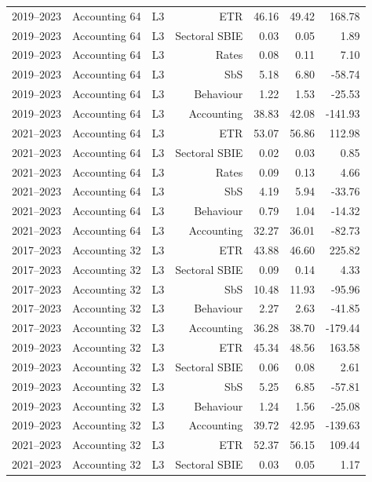 {\begin{longtable}{@{}lrrrrrr@{}}
2019–2023 & Accounting 64 & L3 & ETR & 46.16 & 49.42 &  168.78 \\
2019–2023 & Accounting 64 & L3 & Sectoral SBIE &  0.03 &  0.05 &    1.89 \\
2019–2023 & Accounting 64 & L3 & Rates &  0.08 &  0.11 &    7.10 \\
2019–2023 & Accounting 64 & L3 & SbS &  5.18 &  6.80 &  -58.74 \\
2019–2023 & Accounting 64 & L3 & Behaviour &  1.22 &  1.53 &  -25.53 \\
2019–2023 & Accounting 64 & L3 & Accounting & 38.83 & 42.08 & -141.93 \\
2021–2023 & Accounting 64 & L3 & ETR & 53.07 & 56.86 &  112.98 \\
2021–2023 & Accounting 64 & L3 & Sectoral SBIE &  0.02 &  0.03 &    0.85 \\
2021–2023 & Accounting 64 & L3 & Rates &  0.09 &  0.13 &    4.66 \\
2021–2023 & Accounting 64 & L3 & SbS &  4.19 &  5.94 &  -33.76 \\
2021–2023 & Accounting 64 & L3 & Behaviour &  0.79 &  1.04 &  -14.32 \\
2021–2023 & Accounting 64 & L3 & Accounting & 32.27 & 36.01 &  -82.73 \\
2017–2023 & Accounting 32 & L3 & ETR & 43.88 & 46.60 &  225.82 \\
2017–2023 & Accounting 32 & L3 & Sectoral SBIE &  0.09 &  0.14 &    4.33 \\
2017–2023 & Accounting 32 & L3 & SbS & 10.48 & 11.93 &  -95.96 \\
2017–2023 & Accounting 32 & L3 & Behaviour &  2.27 &  2.63 &  -41.85 \\
2017–2023 & Accounting 32 & L3 & Accounting & 36.28 & 38.70 & -179.44 \\
2019–2023 & Accounting 32 & L3 & ETR & 45.34 & 48.56 &  163.58 \\
2019–2023 & Accounting 32 & L3 & Sectoral SBIE &  0.06 &  0.08 &    2.61 \\
2019–2023 & Accounting 32 & L3 & SbS &  5.25 &  6.85 &  -57.81 \\
2019–2023 & Accounting 32 & L3 & Behaviour &  1.24 &  1.56 &  -25.08 \\
2019–2023 & Accounting 32 & L3 & Accounting & 39.72 & 42.95 & -139.63 \\
2021–2023 & Accounting 32 & L3 & ETR & 52.37 & 56.15 &  109.44 \\
2021–2023 & Accounting 32 & L3 & Sectoral SBIE &  0.03 &  0.05 &    1.17 \\

\end{longtable}}
